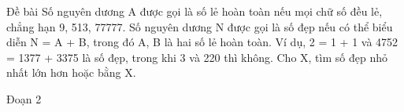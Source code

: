Đề bài
Số nguyên dương A được gọi là số lẻ hoàn toàn nếu mọi chữ số đều lẻ, chẳng hạn 9, 513, 77777. Số nguyên dương N được gọi là số đẹp nếu có thể biểu diễn N = A + B, trong đó A, B là hai số lẻ hoàn toàn. Ví dụ, 2 = 1 + 1 và 4752 = 1377 + 3375 là số đẹp, trong khi 3 và 220 thì không. Cho X, tìm số đẹp nhỏ nhất lớn hơn hoặc bằng X.  

   Đoạn 2